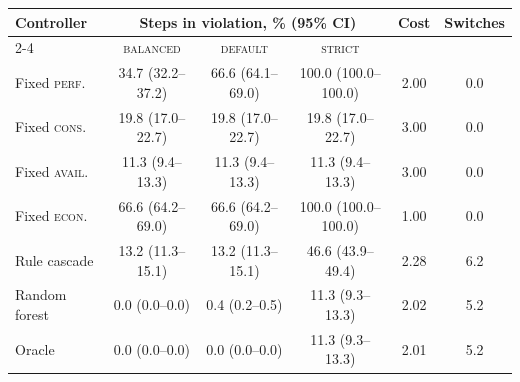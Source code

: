 \begin{tabular}{lccccc}
\toprule
Controller & \multicolumn{3}{c}{Steps in violation, \% (95\% CI)} & Cost & Switches \\
\cmidrule(lr){2-4}
 & \textsc{balanced} & \textsc{default} & \textsc{strict} & & \\
\midrule
Fixed \textsc{perf.} & 34.7 (32.2--37.2) & 66.6 (64.1--69.0) & 100.0 (100.0--100.0) & 2.00 & 0.0 \\
Fixed \textsc{cons.} & 19.8 (17.0--22.7) & 19.8 (17.0--22.7) & 19.8 (17.0--22.7) & 3.00 & 0.0 \\
Fixed \textsc{avail.} & 11.3 (9.4--13.3) & 11.3 (9.4--13.3) & 11.3 (9.4--13.3) & 3.00 & 0.0 \\
Fixed \textsc{econ.} & 66.6 (64.2--69.0) & 66.6 (64.2--69.0) & 100.0 (100.0--100.0) & 1.00 & 0.0 \\
\midrule
Rule cascade & 13.2 (11.3--15.1) & 13.2 (11.3--15.1) & 46.6 (43.9--49.4) & 2.28 & 6.2 \\
Random forest & 0.0 (0.0--0.0) & 0.4 (0.2--0.5) & 11.3 (9.3--13.3) & 2.02 & 5.2 \\
Oracle & 0.0 (0.0--0.0) & 0.0 (0.0--0.0) & 11.3 (9.3--13.3) & 2.01 & 5.2 \\
\bottomrule
\end{tabular}
